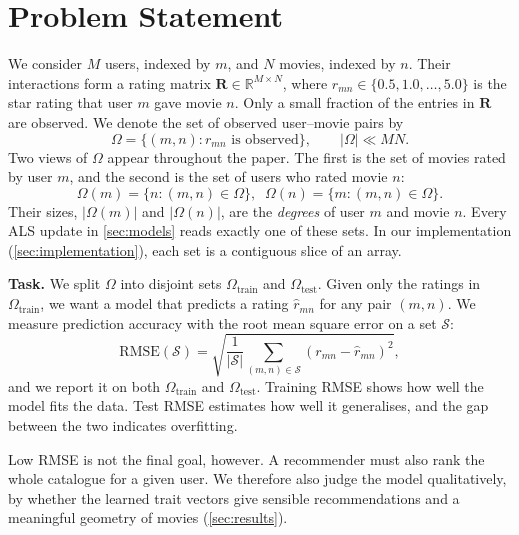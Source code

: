 \documentclass{article}
\theoremstyle{plain}
\theoremstyle{definition}
\theoremstyle{remark}
\begin{document}
\section{Problem Statement}
\label{sec:problem}

We consider $M$ users, indexed by $m$, and $N$ movies, indexed by $n$. Their
interactions form a rating matrix $\mathbf{R} \in \mathbb{R}^{M \times N}$,
where $r_{mn} \in \{0.5, 1.0, \ldots, 5.0\}$ is the star rating that user $m$
gave movie $n$. Only a small fraction of the entries in $\mathbf{R}$ are
observed. We denote the set of observed user--movie pairs by
\begin{equation}
  \Omega = \{(m, n) : r_{mn} \text{ is observed}\}, \qquad |\Omega| \ll MN .
\end{equation}
Two views of $\Omega$ appear throughout the paper. The first is the set of
movies rated by user $m$, and the second is the set of users who rated
movie $n$:
\begin{equation}
  \Omega(m) = \{ n : (m, n) \in \Omega \}, \;\;
  \Omega(n) = \{ m : (m, n) \in \Omega \}.
\end{equation}
Their sizes, $|\Omega(m)|$ and $|\Omega(n)|$, are the \emph{degrees} of user
$m$ and movie $n$. Every ALS update in \cref{sec:models} reads exactly one
of these sets. In our implementation (\cref{sec:implementation}), each set
is a contiguous slice of an array.

\textbf{Task.}
We split $\Omega$ into disjoint sets $\Omega_{\text{train}}$ and
$\Omega_{\text{test}}$. Given only the ratings in $\Omega_{\text{train}}$, we
want a model that predicts a rating $\hat{r}_{mn}$ for any pair $(m, n)$. We
measure prediction accuracy with the root mean square error on a set
$\mathcal{S}$:
\begin{equation}
  \mathrm{RMSE}(\mathcal{S}) =
  \sqrt{\frac{1}{|\mathcal{S}|} \sum_{(m,n) \in \mathcal{S}}
  \left( r_{mn} - \hat{r}_{mn} \right)^2 } ,
  \label{eq:rmse}
\end{equation}
and we report it on both $\Omega_{\text{train}}$ and $\Omega_{\text{test}}$.
Training RMSE shows how well the model fits the data. Test RMSE estimates
how well it generalises, and the gap between the two indicates overfitting.

Low RMSE is not the final goal, however. A recommender must also rank the
whole catalogue for a given user. We therefore also judge the model
qualitatively, by whether the learned trait vectors give sensible
recommendations and a meaningful geometry of movies (\cref{sec:results}).
\end{document}
